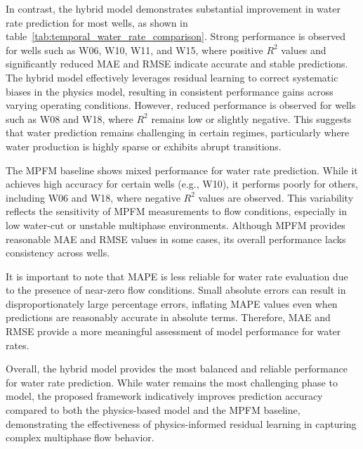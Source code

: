\documentclass[12pt,APA]{uomthesis}
\begin{document}
In contrast, the hybrid model demonstrates substantial improvement in water rate prediction for most wells, as shown in table~\ref{tab:temporal_water_rate_comparison}. Strong performance is observed for wells such as W06, W10, W11, and W15, where positive $R^2$ values and significantly reduced MAE and RMSE indicate accurate and stable predictions. The hybrid model effectively leverages residual learning to correct systematic biases in the physics model, resulting in consistent performance gains across varying operating conditions. However, reduced performance is observed for wells such as W08 and W18, where $R^2$ remains low or slightly negative. This suggests that water prediction remains challenging in certain regimes, particularly where water production is highly sparse or exhibits abrupt transitions.

The MPFM baseline shows mixed performance for water rate prediction. While it achieves high accuracy for certain wells (e.g., W10), it performs poorly for others, including W06 and W18, where negative $R^2$ values are observed. This variability reflects the sensitivity of MPFM measurements to flow conditions, especially in low water-cut or unstable multiphase environments. Although MPFM provides reasonable MAE and RMSE values in some cases, its overall performance lacks consistency across wells.

It is important to note that MAPE is less reliable for water rate evaluation due to the presence of near-zero flow conditions. Small absolute errors can result in disproportionately large percentage errors, inflating MAPE values even when predictions are reasonably accurate in absolute terms. Therefore, MAE and RMSE provide a more meaningful assessment of model performance for water rates.

Overall, the hybrid model provides the most balanced and reliable performance for water rate prediction. While water remains the most challenging phase to model, the proposed framework indicatively improves prediction accuracy compared to both the physics-based model and the MPFM baseline, demonstrating the effectiveness of physics-informed residual learning in capturing complex multiphase flow behavior.
\end{document}
